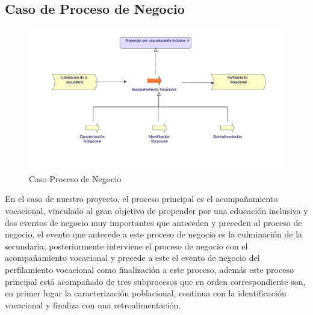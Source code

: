 \subsection{Caso  de Proceso de Negocio}
\begin{figure}[h!]
	\centering
	\includegraphics[width=.9\linewidth]{imgs/caso/negocio/ProcesoNegocio}
	\caption{Caso Proceso de Negocio}
\end{figure}

En el caso de nuestro proyecto, el proceso principal es el acompañamiento vocacional, vinculado al gran objetivo de propender por una educación inclusiva y dos eventos de negocio muy importantes que anteceden y preceden al proceso de negocio, el evento que antecede a este proceso de negocio es la culminación de la secundaria, posteriormente interviene el proceso de negocio con el acompañamiento vocacional y precede a este el evento de negocio del perfilamiento vocacional como finalización a este proceso, además este proceso principal está acompañado de tres subprocesos que en orden correspondiente son, en primer lugar la caracterización poblacional, continua con la identificación vocacional y finaliza con una retroalimentación.
